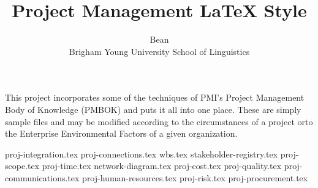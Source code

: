\documentclass {article}
\begin{document}
\title{Project Management {LaTeX} Style}

\author{Bean\\
Brigham Young University School of Linguistics}
\renewcommand{\today}{April 13, 2013}
\maketitle
This project incorporates some of the techniques of PMI's Project Management Body of Knowledge\textregistered {} (PMBOK) and puts it all into one place. These are simply sample files and may be modified according to the circumstances of a project orto the Enterprise Environmental Factors of a given organization.


 {proj-integration.tex}
 {proj-connections.tex}
 {wbs.tex}
 {stakeholder-registry.tex}
 {proj-scope.tex}
 {proj-time.tex}
 {network-diagram.tex}
 {proj-cost.tex}
 {proj-quality.tex}
 {proj-communications.tex}
 {proj-human-resources.tex}
 {proj-risk.tex}
 {proj-procurement.tex}


\end{document}
